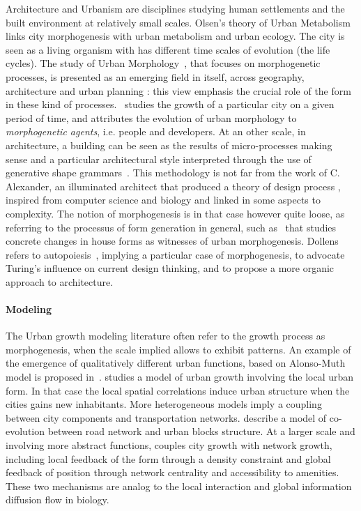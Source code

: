 \documentclass[fleqn,10pt]{wlscirep}
\begin{document}
Architecture and Urbanism are disciplines studying human settlements and the built environment at relatively small scales. Olsen's theory of Urban Metabolism \cite{olsen1982urban} links city morphogenesis with urban metabolism and urban ecology. The city is seen as a living organism with has different time scales of evolution (the life cycles). The study of Urban Morphology~\cite{moudon1997urban}, that focuses on morphogenetic processes, is presented as an emerging field in itself, across geography, architecture and urban planning : this view emphasis the crucial role of the form in these kind of processes.~\cite{burke1972dublin} studies the growth of a particular city on a given period of time, and attributes the evolution of urban morphology to \emph{morphogenetic agents}, i.e. people and developers. At an other scale, in architecture, a building can be seen as the results of micro-processes making sense and a particular architectural style interpreted through the use of generative shape grammars~\cite{ceccarini2001essai}. This methodology is not far from the work of C. Alexander, an illuminated architect that produced a theory of design process \cite{mehaffy2007notes}, inspired from computer science and biology and linked in some aspects to complexity. The notion of morphogenesis is in that case however quite loose, as referring to the processus of form generation in general, such as~\cite{whitehand1999urban} that studies concrete changes in house forms as witnesses of urban morphogenesis. Dollens refers to autopoiesis~\cite{dollens2014alan}, implying a particular case of morphogenesis, to advocate Turing's influence on current design thinking, and to propose a more organic approach to architecture.






\paragraph{Modeling}

The Urban growth modeling literature often refer to the growth process as morphogenesis, when the scale implied allows to exhibit patterns. An example of the emergence of qualitatively different urban functions, based on Alonso-Muth model is proposed in~\cite{bonin2012modele}. \cite{makse1998modeling} studies a model of urban growth involving the local urban form. In that case the local spatial correlations induce urban structure when the cities gains new inhabitants. More heterogeneous models imply a coupling between city components and transportation networks. \cite{achibet2014model} describe a model of co-evolution between road network and urban blocks structure. At a larger scale and involving more abstract functions, \cite{raimbault2014hybrid} couples city growth with network growth, including local feedback of the form through a density constraint and global feedback of position through network centrality and accessibility to amenities. These two mechanisms are analog to the local interaction and global information diffusion flow in biology.
\end{document}
